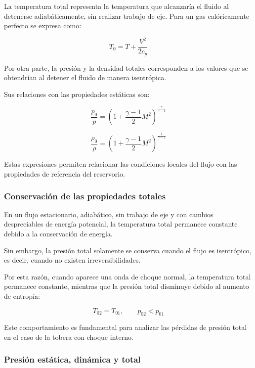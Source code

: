 \documentclass[12pt,letterpaper]{article}
\numberwithin{equation}{section}
\begin{document}
La temperatura total representa la temperatura que
alcanzaría el fluido al detenerse adiabáticamente,
sin realizar trabajo de eje. Para un gas
calóricamente perfecto se expresa como:

\begin{equation}
    T_0=T+\frac{V^2}{2c_p}
\end{equation}

Por otra parte, la presión y la densidad totales
corresponden a los valores que se obtendrían al
detener el fluido de manera isentrópica.

Sus relaciones con las propiedades estáticas son:

\begin{equation}
    \frac{p_0}{p}=
    \left(1+\frac{\gamma-1}{2}M^2\right)^{
    \frac{\gamma}{\gamma-1}}
\end{equation}

\begin{equation}
    \frac{\rho_0}{\rho}=
    \left(1+\frac{\gamma-1}{2}M^2\right)^{
    \frac{1}{\gamma-1}}
\end{equation}

Estas expresiones permiten relacionar las
condiciones locales del flujo con las propiedades
de referencia del reservorio.

\subsubsection{Conservación de las propiedades totales}

En un flujo estacionario, adiabático, sin trabajo
de eje y con cambios despreciables de energía
potencial, la temperatura total permanece
constante debido a la conservación de energía.

Sin embargo, la presión total solamente se
conserva cuando el flujo es isentrópico, es
decir, cuando no existen irreversibilidades.

Por esta razón, cuando aparece una onda de
choque normal, la temperatura total permanece
constante, mientras que la presión total
disminuye debido al aumento de entropía:

\begin{equation}
    T_{02}=T_{01},
    \qquad p_{02}<p_{01}
\end{equation}

Este comportamiento es fundamental para
analizar las pérdidas de presión total
en el caso de la tobera con choque interno.

\subsubsection{Presión estática, dinámica y total}
\end{document}
